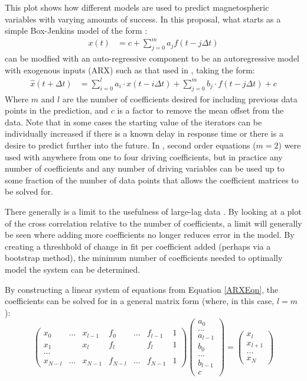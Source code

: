 This plot shows how different models are used to predict magnetospheric variables with varying amounts of success. In this proposal, what starts as a simple Box-Jenkins model of the form \cite{DOYvar}:
\begin{align*}
x(t)&=c+\sum_{j=0}^{m}{a_j f(t-j\Delta t)}
\end{align*}
can be modfied with an auto-regressive component to be an autoregressive model with exogenous inputs (ARX) such as that used in \cite{ARXEqn}, taking the form:
\begin{align}
\hat{x}(t+\Delta t)&=\sum_{i=0}^la_i\cdot x(t-i\Delta t)+\sum_{j=0}^m b_j\cdot f(t-j\Delta t)+c
\label{ARXEqn}
\end{align}
Where $m$ and $l$ are the number of coefficients desired for including previous data points in the prediction, and $c$ is a factor to remove the mean offset from the data. Note that in some cases the starting value of the iterators can be individually increased if there is a known delay in response time or there is a desire to predict further into the future. In \cite{ARXEqn}, second order equations ($m=2$) were used with anywhere from one to four driving coefficients, but in practice any number of coefficients and any number of driving variables can be used up to some fraction of the number of data points that allows the coefficient matrices to be solved for. 

There generally is a limit to the usefulness of large-lag data \cite{ExtremeEvents}. By looking at a plot of the cross correlation relative to the number of coefficients, a limit will generally be seen where adding more coefficients no longer reduces error in the model. By creating a threshhold of change in fit per coefficient added (perhaps via a bootstrap method), the minimum number of coefficients needed to optimally model the system can be determined.

By constructing a linear system of equations from Equation \ref{ARXEqn}, the coefficients can be solved for in a general matrix form (where, in this case, $l=m$):
\[
\left( \begin{array}{ccccccc}
x_0 & ... & x_{l-1} & f_0 & ... & f_{l-1} & 1\\
x_1 &     & x_l & f_l &  &f_l & 1\\
... &     &     &     &  &   & \\
x_{N-l} & ... & x_{N-1} & f_{N-l} & ... & f_{N-1} & 1
\end{array} \right)
\left(\begin{array}{c}
a_0\\...\\a_{l-1}\\b_0\\...\\b_{l-1}\\c
\end{array}\right)
=
\left(
\begin{array}{c}
x_l \\ x_{l+1} \\ ... \\ x_{N}
\end{array}
\right)
\]

